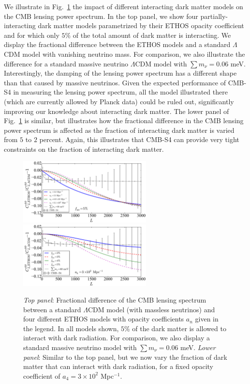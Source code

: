 We illustrate in Fig.~\ref{fig:Cls_phi_PIDM} the impact of different interacting dark matter models on the CMB lensing power spectrum. In the top panel, we show four partially-interacting dark matter models parametrized by their ETHOS opacity coefficient and for which only $5\%$ of the total amount of dark matter is interacting. We display the fractional difference between the ETHOS models and a standard $\Lambda$CDM model with vanishing neutrino mass. For comparison, we also illustrate the difference for a standard massive neutrino $\Lambda$CDM model with $\sum m_\nu = 0.06$ meV.  Interestingly, the damping of the lensing power spectrum has a different shape than that caused by massive neutrinos. Given the expected performance of CMB-S4 in measuring the lensing power spectrum, all the model illustrated there (which are currently allowed by Planck data) could be ruled out, significantly improving our knowledge about interacting dark matter. The lower panel of Fig.~\ref{fig:Cls_phi_PIDM} is similar, but illustrates how the fractional difference in the CMB lensing power spectrum is affected as the fraction of interacting dark matter is varied from $5$ to $2$ percent. Again, this illustrates that CMB-S4 can provide very tight constraints on the fraction of interacting dark matter.

%
\begin{figure}[htbp!]
\includegraphics[width=0.6\textwidth]{DarkEnergy/ClsPP_ETHOS_a_n.pdf}\\
\includegraphics[width=0.6\textwidth]{DarkEnergy/ClsPP_ETHOS_f_int.pdf}
\caption{\emph{Top panel}: Fractional difference of the CMB lensing spectrum between a standard $\Lambda$CDM model (with massless neutrinos) and four different ETHOS models with opacity coefficients $a_n$ given in the legend. In all models shown, $5\%$ of the dark matter is allowed to interact with dark radiation. For comparison, we also display a standard massive neutrino model with $\sum m_\nu =0.06$ meV. \emph{Lower panel}: Similar to the top panel, but we now vary the fraction of dark matter that can interact with dark radiation, for a fixed opacity coefficient of $a_4 = 3\times 10^2$ Mpc$^{-1}$. }\label{fig:Cls_phi_PIDM}
\end{figure}
%

